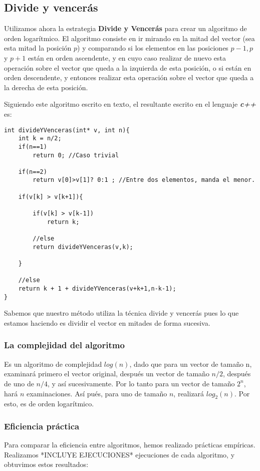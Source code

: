 \documentclass[a4paper, 11pt]{article}
\begin{document}
\subsection{Divide y vencerás}
Utilizamos ahora la estrategia \textbf{Divide y Vencerás} para crear un algoritmo de orden logarítmico. El algoritmo consiste en ir mirando en la mitad del vector (sea esta mitad la posición $p$) y comparando si los elementos en las posiciones $p-1,p$ y $p+1$ están en orden ascendente, y en cuyo caso realizar de nuevo esta operación sobre el vector que queda a la izquierda de esta posición, o si están en orden descendente, y entonces realizar esta operación sobre el vector que queda a la derecha de esta posición.

Siguiendo este algoritmo escrito en texto, el resultante escrito en el lenguaje \emph{\textbf{c++}} es:
\begin{lstlisting}
int divideYVenceras(int* v, int n){
	int k = n/2;
	if(n==1)
		return 0; //Caso trivial
	
	if(n==2)
		return v[0]>v[1]? 0:1 ; //Entre dos elementos, manda el menor.

	if(v[k] > v[k+1]){

		if(v[k] > v[k-1]) 
			return k;

		//else
		return divideYVenceras(v,k);

	}

	//else
	return k + 1 + divideYVenceras(v+k+1,n-k-1);
}

\end{lstlisting}

Sabemos que nuestro método utiliza la técnica divide y vencerás pues lo que estamos haciendo es dividir el vector en mitades de forma sucesiva.

\subsubsection{La complejidad del algoritmo}
Es un algoritmo de complejidad $log(n)$, dado que para un vector de tamaño n, examinará primero el vector original, después un vector de tamaño $n/2$, después de uno de $n/4$, y así sucesivamente. Por lo tanto para un vector de tamaño $2^n$, hará $n$ examinaciones. Así pués, para uno de tamaño $n$, realizará $log_2(n)$. Por esto, es de orden logarítmico.

\subsubsection{Eficiencia práctica}
Para comparar la eficiencia entre algoritmos, hemos realizado prácticas empíricas. Realizamos *INCLUYE EJECUCIONES* ejecuciones de cada algoritmo, y obtuvimos estos resultados:
\end{document}
